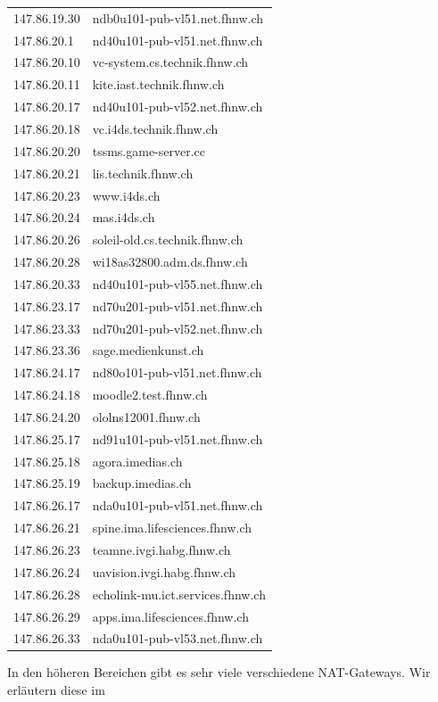 \documentclass[a4paper,11pt]{scrartcl}
\begin{document}
\begin{longtable}{p{2.5cm}|p{7cm}}
	147.86.19.30 & ndb0u101-pub-vl51.net.fhnw.ch \\ 
	147.86.20.1 & nd40u101-pub-vl51.net.fhnw.ch \\ 
	147.86.20.10 & vc-system.cs.technik.fhnw.ch \\ 
	147.86.20.11 & kite.iast.technik.fhnw.ch \\ 
	147.86.20.17 & nd40u101-pub-vl52.net.fhnw.ch \\ 
	147.86.20.18 & vc.i4ds.technik.fhnw.ch \\ 
	147.86.20.20 & tssms.game-server.cc \\ 
	147.86.20.21 & lis.technik.fhnw.ch \\ 
	147.86.20.23 & www.i4ds.ch \\ 
	147.86.20.24 & mas.i4ds.ch \\ 
	147.86.20.26 & soleil-old.cs.technik.fhnw.ch \\ 
	147.86.20.28 & wi18as32800.adm.ds.fhnw.ch \\ 
	147.86.20.33 & nd40u101-pub-vl55.net.fhnw.ch \\ 
	147.86.23.17 & nd70u201-pub-vl51.net.fhnw.ch \\ 
	147.86.23.33 & nd70u201-pub-vl52.net.fhnw.ch \\ 
	147.86.23.36 & sage.medienkunst.ch \\ 
	147.86.24.17 & nd80o101-pub-vl51.net.fhnw.ch \\ 
	147.86.24.18 & moodle2.test.fhnw.ch \\ 
	147.86.24.20 & ololns12001.fhnw.ch \\ 
	147.86.25.17 & nd91u101-pub-vl51.net.fhnw.ch \\ 
	147.86.25.18 & agora.imedias.ch \\ 
	147.86.25.19 & backup.imedias.ch \\ 
	147.86.26.17 & nda0u101-pub-vl51.net.fhnw.ch \\ 
	147.86.26.21 & spine.ima.lifesciences.fhnw.ch \\ 
	147.86.26.23 & teamne.ivgi.habg.fhnw.ch \\ 
	147.86.26.24 & uavision.ivgi.habg.fhnw.ch \\ 
	147.86.26.28 & echolink-mu.ict.services.fhnw.ch \\ 
	147.86.26.29 & apps.ima.lifesciences.fhnw.ch \\ 
	147.86.26.33 & nda0u101-pub-vl53.net.fhnw.ch \\ 
\end{longtable}


In den höheren Bereichen gibt es sehr viele verschiedene NAT-Gateways. Wir erläutern diese im 
\end{document}
